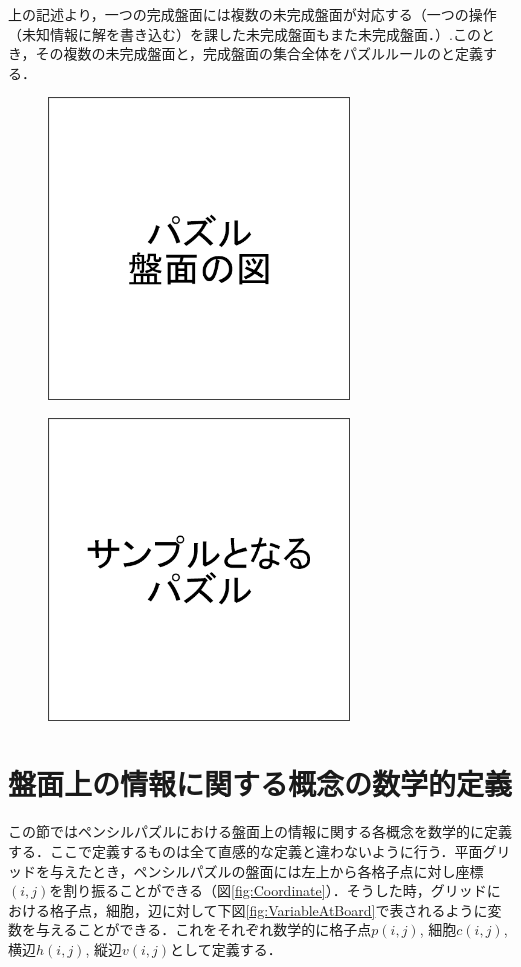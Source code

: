 上の記述より，一つの完成盤面には複数の未完成盤面が対応する（一つの操作（未知情報に解を書き込む）を課した未完成盤面もまた未完成盤面．）.このとき，その複数の未完成盤面と，完成盤面の集合全体をパズルルールのと定義する．

\begin{figure}[htbp]
  \centering
  \includegraphics[width=8cm,clip]{fig/board.png}
  \caption{}
  \label{fig:Board}
\end{figure}

\begin{figure}[htbp]
  \centering
  \includegraphics[width=8cm,clip]{fig/samplePuzzle.png}
  \caption{}
  \label{fig:SamplePuzzle}
\end{figure}



\section{盤面上の情報に関する概念の数学的定義}\label{section3}
この節ではペンシルパズルにおける盤面上の情報に関する各概念を数学的に定義する．ここで定義するものは全て直感的な定義と違わないように行う．平面グリッドを与えたとき，ペンシルパズルの盤面には左上から各格子点に対し座標$(i,j)$を割り振ることができる（図\ref{fig:Coordinate}）．そうした時，グリッドにおける格子点，細胞，辺に対して下図\ref{fig:VariableAtBoard}で表されるように変数を与えることができる．これをそれぞれ数学的に格子点$p(i,j)$, 細胞$c(i,j)$, 横辺$h(i,j)$, 縦辺$v(i,j)$として定義する．

